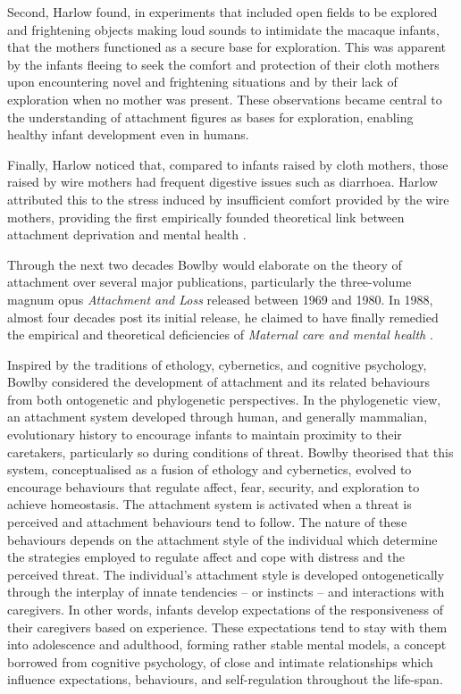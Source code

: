 \documentclass[12pt]{report}
\begin{document}
Second, Harlow found, in experiments that included open fields to be explored and frightening objects making loud sounds to intimidate the macaque infants, that the mothers functioned as a secure base for exploration.
This was apparent by the infants fleeing to seek the comfort and protection of their cloth mothers upon encountering novel and frightening situations and by their lack of exploration when no mother was present.
These observations became central to the understanding of attachment figures as bases for exploration, enabling healthy infant development even in humans.

Finally, Harlow noticed that, compared to infants raised by cloth mothers, those raised by wire mothers had frequent digestive issues such as diarrhoea. Harlow attributed this to the stress induced by insufficient comfort provided by the wire mothers, providing the first empirically founded theoretical link between attachment deprivation and mental health \cite{Harlow1958}.

Through the next two decades Bowlby would elaborate on the theory of attachment over several major publications, particularly the three-volume magnum opus \textit{Attachment and Loss} \cite{Bowlby1969attachment, Bowlby1973separation,Bowlby1980loss} released between 1969 and 1980.
In 1988, almost four decades post its initial release, he claimed to have finally remedied the empirical and theoretical deficiencies of \textit{Maternal care and mental health} \cite{Bowlby1988}.

Inspired by the traditions of ethology, cybernetics, and cognitive psychology, Bowlby considered the development of attachment and its related behaviours from both ontogenetic and phylogenetic perspectives.
In the phylogenetic view, an attachment system developed through human, and generally mammalian, evolutionary history to encourage infants to maintain proximity to their caretakers, particularly so during conditions of threat.
Bowlby theorised that this system, conceptualised as a fusion of ethology and cybernetics, evolved to encourage behaviours that regulate affect, fear, security, and exploration to achieve homeostasis.
The attachment system is activated when a threat is perceived and attachment behaviours tend to follow. The nature of these behaviours depends on the attachment style of the individual which determine the strategies employed to regulate affect and cope with distress and the perceived threat.
The individual's attachment style is developed ontogenetically through the interplay of innate tendencies -- or instincts -- and interactions with caregivers. In other words, infants develop expectations of the responsiveness of their caregivers based on experience.
These expectations tend to stay with them into adolescence and adulthood, forming rather stable mental models, a concept borrowed from cognitive psychology, of close and intimate relationships which influence expectations, behaviours, and self-regulation throughout the life-span.
\end{document}
